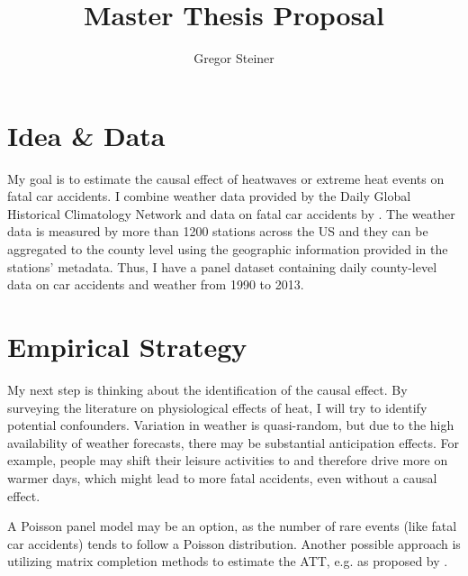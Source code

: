 \documentclass[11pt]{article}
\author{Gregor Steiner}
\title{Master Thesis Proposal}
\begin{document}
\maketitle

\section*{Idea \& Data}

My goal is to estimate the causal effect of heatwaves or extreme heat events on fatal car accidents. I combine weather data provided by the Daily Global Historical Climatology Network \citep{Menne_2012} and data on fatal car accidents by \citet{Smith_2016}. The weather data is measured by more than 1200 stations across the US and they can be aggregated to the county level using the geographic information provided in the stations' metadata. Thus, I have a panel dataset containing daily county-level data on car accidents and weather from 1990 to 2013.

\section*{Empirical Strategy}

My next step is thinking about the identification of the causal effect. By surveying the literature on physiological effects of heat, I will try to identify potential confounders. Variation in weather is quasi-random, but due to the high availability of weather forecasts, there may be substantial anticipation effects. For example, people may shift their leisure activities to and therefore drive more on warmer days, which might lead to more fatal accidents, even without a causal effect.

A Poisson panel model may be an option, as the number of rare events (like fatal car accidents) tends to follow a Poisson distribution. Another possible approach is utilizing matrix completion methods to estimate the ATT, e.g. as proposed by \citet{Athey_2021}.







\end{document}

